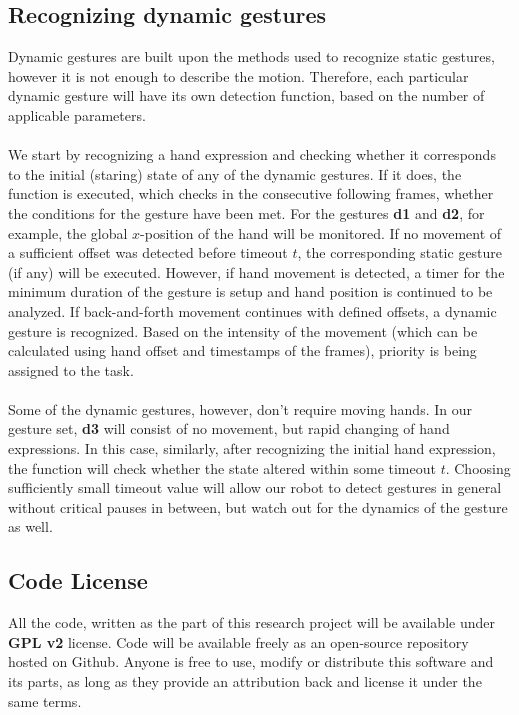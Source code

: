 \documentclass[a4paper,11pt,oneside]{article}
\begin{document}
  \subsection{Recognizing dynamic gestures}
  
  Dynamic gestures are built upon the methods used to recognize static gestures, however it is not enough to describe the motion. Therefore, each particular dynamic gesture will have its own detection function, based on the number of applicable parameters.\\
  \\
  We start by recognizing a hand expression and checking whether it corresponds to the initial (staring) state of any of the dynamic gestures. If it does, the function is executed, which checks in the consecutive following frames, whether the conditions for the gesture have been met. For the gestures \textbf{d1} and \textbf{d2}, for example, the global $x$-position of the hand will be monitored. If no movement of a sufficient offset was detected before timeout $t$, the corresponding static gesture (if any) will be executed. However, if hand movement is detected, a timer for the minimum duration of the gesture is setup and hand position is continued to be analyzed. If back-and-forth movement continues with defined offsets, a dynamic gesture is recognized. Based on the intensity of the movement (which can be calculated using hand offset and timestamps of the frames), priority is being assigned to the task.\\
  \\
  Some of the dynamic gestures, however, don't require moving hands. In our gesture set, \textbf{d3} will consist of no movement, but rapid changing of hand expressions. In this case, similarly, after recognizing the initial hand expression, the function will check whether the state altered within some timeout $t$. Choosing sufficiently small timeout value will allow our robot to detect gestures in general without critical pauses in between, but watch out for the dynamics of the gesture as well.
  
  \subsection{Code License}
  
  All the code, written as the part of this research project will be available under \textbf{GPL v2} license. Code will be available freely as an open-source repository hosted on Github. Anyone is free to use, modify or distribute this software and its parts, as long as they provide an attribution back and license it under the same terms.
  
\end{document}
